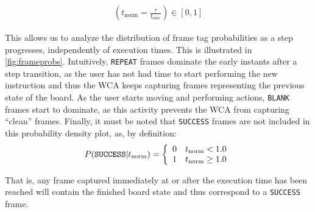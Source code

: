 \begin{align}
    \left( t_\text{norm} = \frac{\tau}{t_\text{exec}} \right) \in [0, 1]\label{eq:tnorm}
\end{align}


This allows us to analyze the distribution of frame tag probabilities as a step progresses, independently of execution times.
This is illustrated in \cref{fig:frameprobs}.
Intuitively, \texttt{REPEAT} frames dominate the early instants after a step transition, as the user has not had time to start performing the new instruction and thus the \ac{WCA} keeps capturing frames representing the previous state of the board.
As the user starts moving and performing actions, \texttt{BLANK} frames start to dominate, as this activity prevents the \ac{WCA} from capturing ``clean'' frames.
Finally, it must be noted that \texttt{SUCCESS} frames are not included in this probability density plot, as, by definition:
\begin{equation}
    P(\text{\texttt{SUCCESS}} | t_\text{norm}) =
    \left\{ \begin{array}{ll}
        0 & t_\text{norm} < 1.0    \\
        1 & t_\text{norm} \geq 1.0
    \end{array} \right.
\end{equation}

That is, any frame captured immediately at or after the execution time has been reached will contain the finished board state and thus correspond to a \texttt{SUCCESS} frame.

